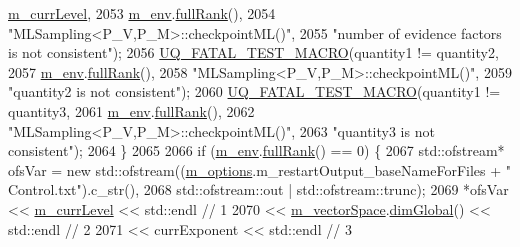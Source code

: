 \begin{DoxyCode}
      \hyperlink{class_q_u_e_s_o_1_1_m_l_sampling_af9416874c856e50f3b35270e801f17e4}{m\_currLevel},
2053                         \hyperlink{class_q_u_e_s_o_1_1_m_l_sampling_a13f1ca4fe9f94822fe572a743eaced1d}{m\_env}.\hyperlink{class_q_u_e_s_o_1_1_base_environment_a84a239e42ae443cf71db6e03e8159620}{fullRank}(),
2054                         \textcolor{stringliteral}{"MLSampling<P\_V,P\_M>::checkpointML()"},
2055                         \textcolor{stringliteral}{"number of evidence factors is not consistent"});
2056     \hyperlink{_defines_8h_a56d63d18d0a6d45757de47fcc06f574d}{UQ\_FATAL\_TEST\_MACRO}(quantity1 != quantity2,
2057                         \hyperlink{class_q_u_e_s_o_1_1_m_l_sampling_a13f1ca4fe9f94822fe572a743eaced1d}{m\_env}.\hyperlink{class_q_u_e_s_o_1_1_base_environment_a84a239e42ae443cf71db6e03e8159620}{fullRank}(),
2058                         \textcolor{stringliteral}{"MLSampling<P\_V,P\_M>::checkpointML()"},
2059                         \textcolor{stringliteral}{"quantity2 is not consistent"});
2060     \hyperlink{_defines_8h_a56d63d18d0a6d45757de47fcc06f574d}{UQ\_FATAL\_TEST\_MACRO}(quantity1 != quantity3,
2061                         \hyperlink{class_q_u_e_s_o_1_1_m_l_sampling_a13f1ca4fe9f94822fe572a743eaced1d}{m\_env}.\hyperlink{class_q_u_e_s_o_1_1_base_environment_a84a239e42ae443cf71db6e03e8159620}{fullRank}(),
2062                         \textcolor{stringliteral}{"MLSampling<P\_V,P\_M>::checkpointML()"},
2063                         \textcolor{stringliteral}{"quantity3 is not consistent"});
2064   \}
2065 
2066   \textcolor{keywordflow}{if} (\hyperlink{class_q_u_e_s_o_1_1_m_l_sampling_a13f1ca4fe9f94822fe572a743eaced1d}{m\_env}.\hyperlink{class_q_u_e_s_o_1_1_base_environment_a84a239e42ae443cf71db6e03e8159620}{fullRank}() == 0) \{
2067     std::ofstream* ofsVar = \textcolor{keyword}{new} std::ofstream((\hyperlink{class_q_u_e_s_o_1_1_m_l_sampling_af8504cc57ec72b3c52833826b2bfff8e}{m\_options}.m\_restartOutput\_baseNameForFiles + \textcolor{stringliteral}{"
      Control.txt"}).c\_str(),
2068                                               std::ofstream::out | std::ofstream::trunc);
2069     *ofsVar << \hyperlink{class_q_u_e_s_o_1_1_m_l_sampling_af9416874c856e50f3b35270e801f17e4}{m\_currLevel}               << std::endl  \textcolor{comment}{// 1}
2070             << \hyperlink{class_q_u_e_s_o_1_1_m_l_sampling_a7bc4c72f65ba9166ed94a6e198b0915b}{m\_vectorSpace}.\hyperlink{class_q_u_e_s_o_1_1_vector_space_acd4359dc120905c22ca1064e33787239}{dimGlobal}() << std::endl  \textcolor{comment}{// 2}
2071             << currExponent              << std::endl  \textcolor{comment}{// 3}

\end{DoxyCode}
